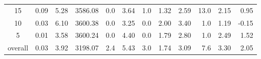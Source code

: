 \begin{table}[H]
\begin{tabular}{c rrrr rr rrr rr}
      15 &           0.09 &        5.28 &    3586.08 &  0.0 &          3.64 &      1.0 &          1.32 &          2.59 &     13.0 &             2.15 &  0.95 \\
      10 &           0.03 &        6.10 &    3600.38 &  0.0 &          3.25 &      0.0 &          2.00 &          3.40 &      1.0 &             1.19 & -0.15 \\
       5 &           0.01 &        3.58 &    3600.24 &  0.0 &          4.40 &      0.0 &          1.79 &          2.80 &      1.0 &             2.49 &  1.52 \\
\midrule
 overall &           0.03 &        3.92 &    3198.07 &  2.4 &          5.43 &      3.0 &          1.74 &          3.09 &      7.6 &             3.30 &  2.05 \\
\bottomrule
\end{tabular}
\end{table}